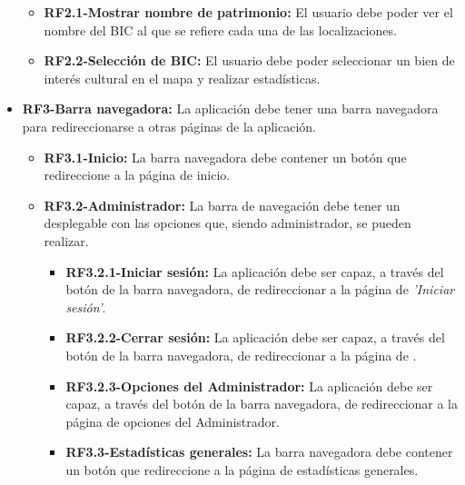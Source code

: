 \begin{itemize}
    \begin{itemize}
        \item \textbf{RF2.1-Mostrar nombre de patrimonio:} El usuario debe poder ver el nombre del BIC al que se refiere cada una de las localizaciones.
        \item \textbf{RF2.2-Selección de BIC:} El usuario debe poder seleccionar un bien de interés cultural en el mapa y realizar estadísticas.
    \end{itemize}
    \item \textbf{RF3-Barra navegadora:} La aplicación debe tener una barra navegadora para redireccionarse a otras páginas de la aplicación.
    \begin{itemize}
        \item \textbf{RF3.1-Inicio:} La barra navegadora debe contener un botón que redireccione a la página de inicio.
        \item \textbf{RF3.2-Administrador:} La barra de navegación debe tener un desplegable con las opciones que, siendo administrador, se pueden realizar.
        \begin{itemize}
            \item \textbf{RF3.2.1-Iniciar sesión:} La aplicación debe ser capaz, a través del botón de la barra navegadora, de redireccionar a la página de \textit{'Iniciar sesión'}.
            \item \textbf{RF3.2.2-Cerrar sesión:} La aplicación debe ser capaz, a través del botón de la barra navegadora, de redireccionar a la página de .
            \item \textbf{RF3.2.3-Opciones del Administrador:} La aplicación debe ser capaz, a través del botón de la barra navegadora, de redireccionar a la página de opciones del Administrador.
        \item \textbf{RF3.3-Estadísticas generales:} La barra navegadora debe contener un botón que redireccione a la página de estadísticas generales.
            

\end{itemize}
\end{itemize}
\end{itemize}
